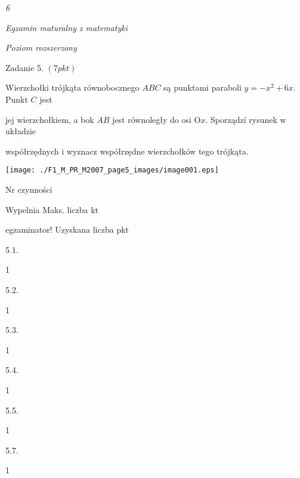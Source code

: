 \documentclass[a4paper,12pt]{article}
\begin{document}
{\it 6}

{\it Egzamin maturalny z matematyki}

{\it Poziom rozszerzony}

Zadanie 5. $(7pkt)$

Wierzchołki trójkąta równobocznego $ABC$ są punktami paraboli $y=-x^{2}+6x$. Punkt $C$ jest

jej wierzchołkiem, a bok $AB$ jest równoległy do osi $\mathrm{O}x$. Sporządzí rysunek w układzie

współrzędnych i wyznacz współrzędne wierzchołków tego trójkąta.
\begin{center}
\texttt{[image: ./F1\_M\_PR\_M2007\_page5\_images/image001.eps]}
\end{center}
Nr czynności

Wypelnia Maks. liczba kt

egzaminator! Uzyskana liczba pkt

5.1.

1

5.2.

1

5.3.

1

5.4.

1

5.5.

1

5.7.

1
\end{document}

